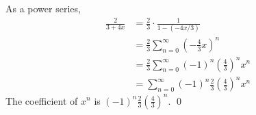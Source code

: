 As a power series,
\begin{align*}
\frac{2}{3 + 4x}
&= \frac{2}{3} \cdot \frac{1}{1 - (-4x/3)}
\\
&= \frac{2}{3} \sum_{n=0}^\infty \left( -\frac{4}{3}x \right)^n
\\
&= \frac{2}{3} \sum_{n=0}^\infty (-1)^n \left( \frac{4}{3} \right)^n x^n
\\
&= \sum_{n=0}^\infty (-1)^n \frac{2}{3} \left( \frac{4}{3} \right)^n x^n
\end{align*}
The coefficient of $x^n$ is
$\displaystyle
(-1)^n \frac{2}{3} \left( \frac{4}{3} \right)^n
$.
\qed
